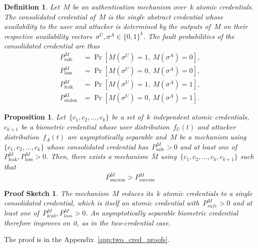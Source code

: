 \documentclass[conference,compsoc]{IEEEtran}
\newtheorem{proposition}{Proposition}
\newtheorem*{proofsketch}{Proof Sketch}
\newtheorem{definition}{Definition}
\begin{document}
\begin{definition}
Let~$M$ be an authentication mechanism over~$k$ atomic credentials. The \emph{consolidated credential} of~$M$ is the single abstract credential whose availability to the user and attacker is determined by the outputs of~$M$ on their respective availability vectors~$\sigma^U,\sigma^A\in\{0,1\}^k$. The fault probabilities of the consolidated credential are thus
\begin{align*}
P^M_{\text{safe}}
&=
\Pr\left[M(\sigma^U)=1,\ M(\sigma^A)=0\right],\\
P^M_{\text{loss}}
&=
\Pr\left[M(\sigma^U)=0,\ M(\sigma^A)=0\right],\\
P^M_{\text{leak}}
&=
\Pr\left[M(\sigma^U)=1,\ M(\sigma^A)=1\right],\\
P^M_{\text{stolen}}
&=
\Pr\left[M(\sigma^U)=0,\ M(\sigma^A)=1\right].
\end{align*}
\end{definition}
\begin{proposition}\label{thm:suf_nec_cond_for_improve_k_atm}
    Let~$\{c_1,c_2,\ldots,c_k\}$ be a set of~$k$ independent atomic credentials,~$c_{k+1}$ be a biometric credential whose user distribution~$f_U(t)$ and attacker distribution~$f_A(t)$ are asymptotically separable and~$M$ be a mechanism using~$\{c_1,c_2,\ldots,c_k\}$ whose consolidated credential has~$P^M_\text{safe} > 0$ and at least one of~$P^M_\text{leak},P^M_\text{loss} > 0$. Then, there exists a mechanism~$\bar{M}$ using~$\{c_1,c_2,\ldots,c_k,c_{k+1}\}$ such that
    \begin{equation*}
        P_{\mathrm{success}}^{\bar{M}} > P_{\mathrm{success}}^{M}
    \end{equation*}
\end{proposition}
\begin{proofsketch}
The mechanism~$M$ reduces its~$k$ atomic credentials to a single consolidated credential, which is itself an atomic credential with~$P^M_{safe} > 0$ and at least one of~$P^M_{leak}, P^M_{loss} > 0$.
An asymptotically separable biometric credential therefore improves on it, as in the two-credential case.
\end{proofsketch}
\noindent
The proof is in the Appendix~\ref{app:two_cred_proofs}.
\end{document}
